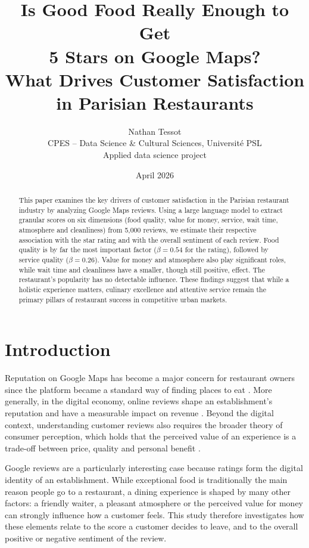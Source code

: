 \documentclass[11pt,a4paper]{article}
\title{\vspace{-1.2cm}\textbf{Is Good Food Really Enough to Get\\ 5 Stars on Google Maps?}\\[4pt]
\large What Drives Customer Satisfaction in Parisian Restaurants}
\author{Nathan Tessot\\[2pt]
\small CPES -- Data Science \& Cultural Sciences, Université PSL\\
\small Applied data science project}
\date{\small April 2026}
\begin{document}
\maketitle

\begin{abstract}
\noindent
This paper examines the key drivers of customer satisfaction in the Parisian
restaurant industry by analyzing Google Maps reviews. Using a large language
model to extract granular scores on six dimensions (food quality, value for
money, service, wait time, atmosphere and cleanliness) from 5,000 reviews, we
estimate their respective association with the star rating and with the
overall sentiment of each review. Food quality is by far the most important
factor ($\beta = 0.54$ for the rating), followed by service quality
($\beta = 0.26$).
Value for money and atmosphere also play significant roles, while wait time
and cleanliness have a smaller, though still positive, effect. The
restaurant's popularity has no detectable influence. These findings suggest
that while a holistic experience matters, culinary excellence and attentive
service remain the primary pillars of restaurant success in competitive urban
markets.
\end{abstract}

\section{Introduction}

Reputation on Google Maps has become a major concern for restaurant owners
since the platform became a standard way of finding places to eat
\citep{li2020}. More generally, in the digital economy, online reviews shape an
establishment's reputation and have a measurable impact on revenue
\citep{luca2016}. Beyond the digital context, understanding customer reviews
also requires the broader theory of consumer perception, which holds that the
perceived value of an experience is a trade-off between price, quality and
personal benefit \citep{zeithaml1988}.

Google reviews are a particularly interesting case because ratings form the
digital identity of an establishment. While exceptional food is traditionally
the main reason people go to a restaurant, a dining experience is shaped by
many other factors: a friendly waiter, a pleasant atmosphere or the perceived
value for money can strongly influence how a customer feels. This study
therefore investigates how these elements relate to the score a customer
decides to leave, and to the overall positive or negative sentiment of the
review.
\end{document}

